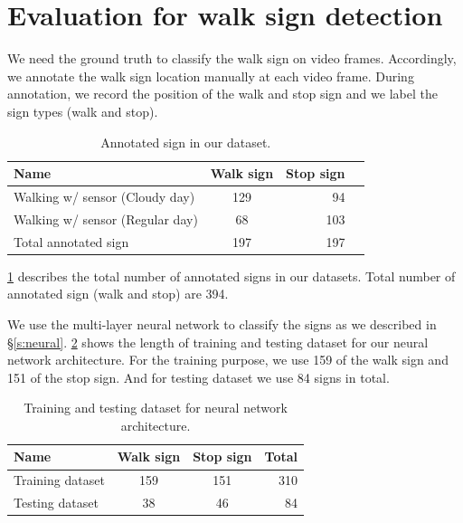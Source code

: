 \section{Evaluation for walk sign detection}
We need the ground truth to classify the walk sign on video frames.
Accordingly, we annotate the walk sign location manually at each video frame.
During annotation, we record the position of the walk and stop sign and we label the sign types (walk and stop). 

\begin{table}[ht!]
  \centering
  \caption{Annotated sign in our dataset.}
  \label{t:walk_sign_ann}
  \begin{tabular}{  l  c  r r }
    \rowcolor{gray!50}
    Name & Walk sign  & Stop sign \\
    \hline
    Walking w/ sensor (Cloudy day) & 129 & 94 \\ %
    Walking w/ sensor (Regular day) & 68 & 103  \\%
    Total annotated sign & 197 & 197 \\
    \hline
  \end{tabular}
\end{table}

\ref{t:walk_sign_ann} describes the total number of annotated signs in our datasets.
Total number of annotated sign (walk and stop) are 394.

We use the multi-layer neural network to classify the signs as we described in \S\ref{s:neural}.
\ref{t:training_neural} shows the length of training and testing dataset for our neural network architecture.
For the training purpose, we use 159 of the walk sign and 151 of the stop sign.
And for testing dataset we use 84 signs in total.

\begin{table}[ht!]
  \centering
  \caption{Training and testing dataset for neural network architecture.}
  \label{t:training_neural}
  \begin{tabular}{  l  c  c  r}
    \rowcolor{gray!50}
    Name & Walk sign & Stop sign & Total \\
    \hline
    Training dataset & 159 & 151 & 310\\ %
    Testing dataset & 38 & 46 & 84 \\%
   
    \hline
  \end{tabular}
\end{table}

